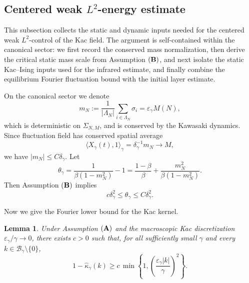 \documentclass{article}
\newtheorem{lemma}{Lemma}
\begin{document}
\subsection{Centered weak \(L^2\)-energy estimate}
\label{subsec:centered-weak-l2-energy}

This subsection collects the static and dynamic inputs needed for the
centered weak \(L^2\)-control of the Kac field.  The argument is self-contained
within the canonical sector: we first record the conserved mass normalization,
then derive the critical static mass scale from Assumption \(({\bf B})\), and
next isolate the static Kac--Ising inputs used for the infrared estimate, and
finally combine the equilibrium Fourier fluctuation bound with the initial
layer estimate.

On the canonical sector we denote
\[
m_N:=\frac1{|\Lambda_N|}\sum_{i\in\Lambda_N}\sigma_i
=\varepsilon_\gamma M(N),
\]
which is deterministic on \(\Sigma_{N,M}\), and is conserved by the
Kawasaki dynamics.
Since fluctuation field has conserved spatial average
\begin{equation}\label{eq:mass-sector-implies-mN-small}
    \langle X_\gamma(t),1\rangle_\gamma =\delta_\gamma^{-1}m_N \to M,
\end{equation}
we have $|m_N| \le C\delta_\gamma $.
Let
\[
\theta_\gamma
=
\frac{1}{\beta(1-m_N^2)}-1
=
\frac{1-\beta}{\beta}
+\frac{m_N^2}{\beta(1-m_N^2)}.
\]
Then Assumption \(({\bf B})\) implies
\begin{equation}\label{eq:critical-static-mass-rate}
c\delta_\gamma^2
\le
\theta_\gamma
\le
C\delta_\gamma^2 .
\end{equation}


Now we give the Fourier lower bound for the Kac kernel. 
\begin{lemma}\label{lem:kac-kernel-fourier-lower}
Under Assumption \(({\bf A})\) and the macroscopic Kac discretization
\(\varepsilon_\gamma/\gamma\to0\), there exists \(c>0\) such that, for all
sufficiently small \(\gamma\) and every \(k\in\mathcal B_\gamma\setminus\{0\}\),
\begin{equation}
\label{eq:kac-kernel-fourier-lower}
1-\widehat\kappa_\gamma(k)
\ge
c\,\min\left\{1,
\left(\frac{\varepsilon_\gamma |k|}{\gamma}\right)^2
\right\}.
\end{equation}
\end{lemma}
\end{document}
